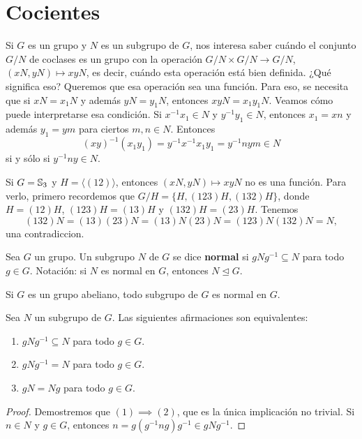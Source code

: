 \chapter{Cocientes}
\label{cocientes}

Si $G$ es un grupo y $N$ es un subgrupo de $G$, nos interesa saber cuándo 
el conjunto $G/N$ de coclases es un grupo con 
la operación $G/N\times G/N\to G/N$,  
$(xN,yN)\mapsto xyN$, es decir, cuándo esta operación está 
bien definida. ¿Qué significa eso? Queremos que esa operación sea una función. 
Para eso, se necesita que si $xN=x_1N$ y además $yN=y_1N$, entonces
$xyN=x_1y_1N$. Veamos cómo puede interpretarse esa condición. Si $x^{-1}x_1\in N$ y 
$y^{-1}y_1\in N$, entonces $x_1=xn$ y además $y_1=ym$ para ciertos $m,n\in N$. Entonces
\[
(xy)^{-1}(x_1y_1)=y^{-1}x^{-1}x_1y_1=y^{-1}nym\in N
\]
si y sólo si $y^{-1}ny\in N$. 

\begin{example}
Si $G=\mathbb{S}_3$ y $H=\langle (12)\rangle$, entonces $(xN,yN)\mapsto xyN$ no es una función. Para verlo, primero recordemos que 
$G/H=\{H,(123)H,(132)H\}$, donde 
$H=(12)H$, $(123)H=(13)H$ y $(132)H=(23)H$. Tenemos
\[
(132)N=(13)(23)N=(13)N(23)N=(123)N(132)N=N,
\]
una contradiccion. 
\end{example}

\begin{definition}
	Sea $G$ un grupo. 
	Un subgrupo $N$ de $G$ se dice \textbf{normal} si $gNg^{-1}\subseteq N$ para todo
	$g\in G$. Notación: si $N$ es normal en $G$, entonces $N\unlhd G$.
\end{definition}

Si $G$ es un grupo abeliano, todo subgrupo de $G$ es normal en $G$. 

\begin{proposition}
\label{pro:normalidad}
Sea $N$ un subgrupo de $G$. Las siguientes afirmaciones son equivalentes:
\begin{enumerate}
	\item $gNg^{-1}\subseteq N$ para todo $g\in G$.
	\item $gNg^{-1}=N$ para todo $g\in G$.
	\item $gN=Ng$ para todo $g\in G$.
\end{enumerate}	
\end{proposition}

\begin{proof}
Demostremos que $(1)\implies (2)$, que es la única implicación no trivial. Si $n\in N$ y $g\in G$, entonces
$n=g(g^{-1}ng)g^{-1}\in gNg^{-1}$. 	
\end{proof}

